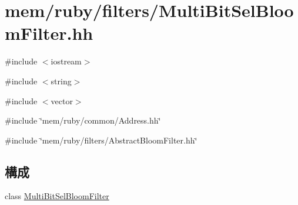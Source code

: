 \hypertarget{MultiBitSelBloomFilter_8hh}{
\section{mem/ruby/filters/MultiBitSelBloomFilter.hh}
\label{MultiBitSelBloomFilter_8hh}
}
{\ttfamily \#include $<$iostream$>$}\par
{\ttfamily \#include $<$string$>$}\par
{\ttfamily \#include $<$vector$>$}\par
{\ttfamily \#include \char`\"{}mem/ruby/common/Address.hh\char`\"{}}\par
{\ttfamily \#include \char`\"{}mem/ruby/filters/AbstractBloomFilter.hh\char`\"{}}\par
\subsection*{構成}
\begin{DoxyCompactItemize}
\item 
class \hyperlink{classMultiBitSelBloomFilter}{MultiBitSelBloomFilter}
\end{DoxyCompactItemize}

